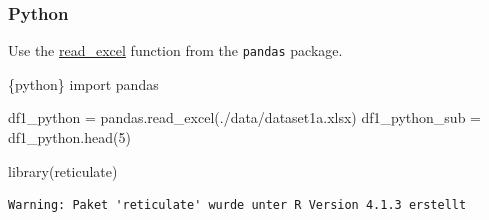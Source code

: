 \documentclass[
  letterpaper,
  DIV=11,
  numbers=noendperiod,
  oneside]{scrreprt}
\newenvironment{Shaded}{\begin{snugshade}}{\end{snugshade}}
\newcommand{\DecValTok}[1]{\textcolor[rgb]{0.68,0.00,0.00}{#1}}
\newcommand{\FunctionTok}[1]{\textcolor[rgb]{0.28,0.35,0.67}{#1}}
\newcommand{\ImportTok}[1]{\textcolor[rgb]{0.00,0.46,0.62}{#1}}
\newcommand{\InformationTok}[1]{\textcolor[rgb]{0.37,0.37,0.37}{#1}}
\newcommand{\NormalTok}[1]{\textcolor[rgb]{0.00,0.23,0.31}{#1}}
\newcommand{\OperatorTok}[1]{\textcolor[rgb]{0.37,0.37,0.37}{#1}}
\newcommand{\SpecialCharTok}[1]{\textcolor[rgb]{0.37,0.37,0.37}{#1}}
\newcommand{\StringTok}[1]{\textcolor[rgb]{0.13,0.47,0.30}{#1}}
\begin{document}
\hypertarget{python}{%
\subsubsection{Python}\label{python}}

Use the
\href{https://pandas.pydata.org/docs/reference/api/pandas.read_excel.html}{read\_excel}
function from the \texttt{pandas} package.

\begin{Shaded}
\begin{Highlighting}[]
\InformationTok{\textasciigrave{}\textasciigrave{}\textasciigrave{}\{python\}}
\ImportTok{import}\NormalTok{ pandas}

\NormalTok{df1\_python }\OperatorTok{=}\NormalTok{ pandas.read\_excel(}\StringTok{\textquotesingle{}./data/dataset1a.xlsx\textquotesingle{}}\NormalTok{)}
\NormalTok{df1\_python\_sub }\OperatorTok{=}\NormalTok{ df1\_python.head(}\DecValTok{5}\NormalTok{)}
\InformationTok{\textasciigrave{}\textasciigrave{}\textasciigrave{}}
\end{Highlighting}
\end{Shaded}

\begin{Shaded}
\begin{Highlighting}[]
\FunctionTok{library}\NormalTok{(reticulate)}
\end{Highlighting}
\end{Shaded}

\begin{verbatim}
Warning: Paket 'reticulate' wurde unter R Version 4.1.3 erstellt
\end{verbatim}

\begin{Shaded}
\end{Shaded}
\end{document}

